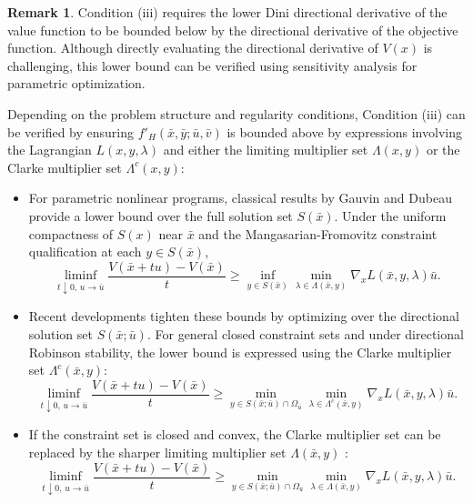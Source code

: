 \documentclass[12pt,twoside,reqno]{amsart}
\theoremstyle{definition}
\newtheorem{remark}[theorem]{Remark}
\numberwithin{equation}{section}
\begin{document}
\begin{remark}\label{rem:verification_cond_iii}
Condition (iii) requires the lower Dini directional derivative of the value function to be bounded below by the directional derivative of the objective function. Although directly evaluating the directional derivative of $V(x)$ is challenging, this lower bound can be verified using sensitivity analysis for parametric optimization.

Depending on the problem structure and regularity conditions, Condition (iii) can be verified by ensuring $f'_H(\bar{x}, \bar{y}; \bar{u}, \bar{v})$ is bounded above by expressions involving the Lagrangian $L(x,y,\lambda)$ and either the limiting multiplier set $\Lambda(x,y)$ or the Clarke multiplier set $\Lambda^c(x,y)$: 

\begin{itemize}
    \item For parametric nonlinear programs, classical results by Gauvin and Dubeau \cite[Corollary 4.3]{gauvin1982differential} provide a lower bound over the full solution set $S(\bar{x})$. Under the uniform compactness of $S(x)$ near $\bar{x}$ and the Mangasarian-Fromovitz constraint qualification at each $y \in S(\bar{x})$,  
    \begin{equation*}
        \liminf_{t \downarrow 0, \, u \to \bar{u}} \frac{V(\bar{x} + t u) - V(\bar{x})}{t} \ge \inf_{y \in S(\bar{x})} \min_{\lambda \in \Lambda(\bar{x}, y)} \nabla_x L(\bar{x}, y, \lambda)\bar{u}.
    \end{equation*}
    
    \item Recent developments \cite[Section 4]{bai2024directional} tighten these bounds by optimizing over the directional solution set $S(\bar{x}; \bar{u})$. For general closed constraint sets and under directional Robinson stability, the lower bound is expressed using the Clarke multiplier set $\Lambda^c(\bar{x}, y)$:
    \begin{equation*}
        \liminf_{t \downarrow 0, \, u \to \bar{u}} \frac{V(\bar{x} + t u) - V(\bar{x})}{t} \ge \min_{y \in S(\bar{x}; \bar{u}) \cap \Omega_{\bar{u}}} \min_{\lambda \in \Lambda^c(\bar{x}, y)} \nabla_x L(\bar{x}, y, \lambda)\bar{u}.
    \end{equation*}

    \item If the constraint set is closed and convex, the Clarke multiplier set can be replaced by the sharper limiting multiplier set $\Lambda(\bar{x}, y)$ \cite{bai2024directional}:
    \begin{equation*}
        \liminf_{t \downarrow 0, \, u \to \bar{u}} \frac{V(\bar{x} + t u) - V(\bar{x})}{t} \ge \min_{y \in S(\bar{x}; \bar{u}) \cap \Omega_{\bar{u}}} \min_{\lambda \in \Lambda(\bar{x}, y)} \nabla_x L(\bar{x}, y, \lambda)\bar{u}.
    \end{equation*}


\end{itemize}
\end{remark}
\end{document}
